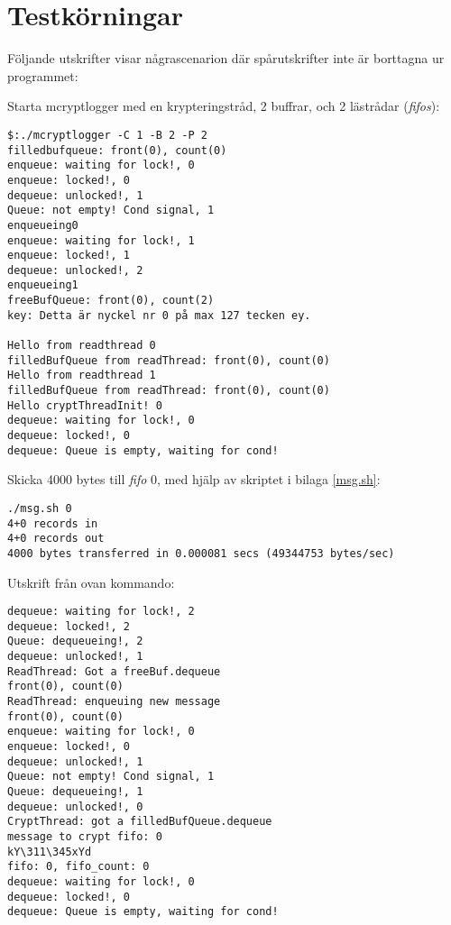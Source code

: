 \documentclass[a4paper, 12pt]{article}
\begin{document}
\section{Testkörningar}\label{sec:testkorningar}
Följande utskrifter visar någrascenarion där spårutskrifter inte är
borttagna ur programmet:

Starta mcryptlogger med en krypteringstråd, 2 buffrar, och 2 lästrådar (\textit{fifos}):
\begin{footnotesize}
\begin{verbatim}
$:./mcryptlogger -C 1 -B 2 -P 2
filledbufqueue: front(0), count(0)
enqueue: waiting for lock!, 0
enqueue: locked!, 0
dequeue: unlocked!, 1
Queue: not empty! Cond signal, 1
enqueueing0
enqueue: waiting for lock!, 1
enqueue: locked!, 1
dequeue: unlocked!, 2
enqueueing1
freeBufQueue: front(0), count(2)
key: Detta är nyckel nr 0 på max 127 tecken ey.

Hello from readthread 0
filledBufQueue from readThread: front(0), count(0)
Hello from readthread 1
filledBufQueue from readThread: front(0), count(0)
Hello cryptThreadInit! 0
dequeue: waiting for lock!, 0
dequeue: locked!, 0
dequeue: Queue is empty, waiting for cond!
\end{verbatim}
\end{footnotesize}

Skicka 4000 bytes till \textit{fifo} 0, med hjälp av skriptet i bilaga
\ref{msg.sh}:
\begin{footnotesize}
\begin{verbatim}
./msg.sh 0
4+0 records in
4+0 records out
4000 bytes transferred in 0.000081 secs (49344753 bytes/sec)
\end{verbatim}
\end{footnotesize}

Utskrift från ovan kommando:
\begin{footnotesize}
\begin{verbatim}
dequeue: waiting for lock!, 2
dequeue: locked!, 2
Queue: dequeueing!, 2
dequeue: unlocked!, 1
ReadThread: Got a freeBuf.dequeue
front(0), count(0)
ReadThread: enqueuing new message
front(0), count(0)
enqueue: waiting for lock!, 0
enqueue: locked!, 0
dequeue: unlocked!, 1
Queue: not empty! Cond signal, 1
Queue: dequeueing!, 1
dequeue: unlocked!, 0
CryptThread: got a filledBufQueue.dequeue
message to crypt fifo: 0
kY\311\345xYd
fifo: 0, fifo_count: 0
dequeue: waiting for lock!, 0
dequeue: locked!, 0
dequeue: Queue is empty, waiting for cond!
\end{verbatim}
\end{footnotesize}
\end{document}
